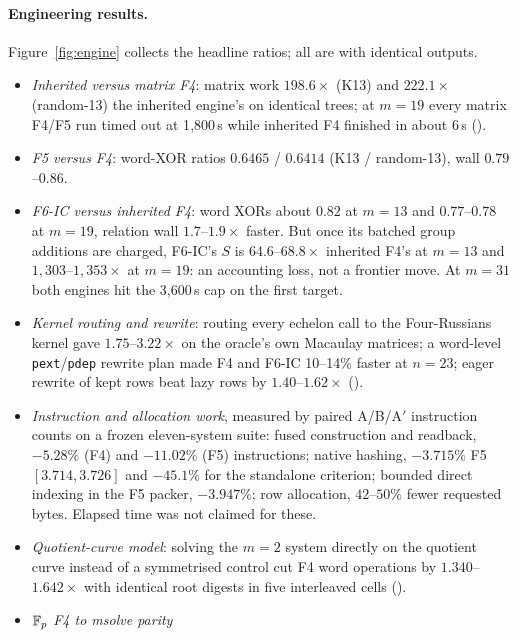 \paragraph{Engineering results.} Figure~\ref{fig:engine} collects the
headline ratios; all are  with identical outputs.
\begin{itemize}
\item \emph{Inherited versus matrix F4}: matrix work $198.6\times$ (K13)
  and $222.1\times$ (random-13) the inherited engine's on identical trees;
  at $m=19$ every matrix F4/F5 run timed out at 1{,}800\,s while
  inherited F4 finished in about 6\,s
  ().
\item \emph{F5 versus F4}: word-XOR ratios $0.6465$ / $0.6414$ (K13 /
  random-13), wall $0.79$--$0.86$.
\item \emph{F6-IC versus inherited F4}: word XORs about $0.82$ at $m=13$
  and $0.77$--$0.78$ at $m=19$, relation wall $1.7$--$1.9\times$ faster.
  But once its batched group additions are charged, F6-IC's $S$ is
  $64.6$--$68.8\times$ inherited F4's at $m=13$ and
  $1{,}303$--$1{,}353\times$ at $m=19$: an accounting loss, not a frontier
  move. At $m=31$ both engines hit the 3{,}600\,s cap on the first target.
\item \emph{Kernel routing and rewrite}: routing every echelon call to the
  Four-Russians kernel gave $1.75$--$3.22\times$ on the oracle's own
  Macaulay matrices; a word-level \texttt{pext}/\texttt{pdep} rewrite plan
  made F4 and F6-IC 10--14\% faster at $n=23$; eager rewrite of kept rows
  beat lazy rows by $1.40$--$1.62\times$
  ().
\item \emph{Instruction and allocation work}, measured by paired A/B/A$'$
  instruction counts on a frozen eleven-system suite: fused construction
  and readback, $-5.28\%$ (F4) and $-11.02\%$ (F5) instructions; native
  hashing, $-3.715\%$ F5 $[3.714,3.726]$ and $-45.1\%$ for the standalone
  criterion; bounded direct indexing in the F5 packer, $-3.947\%$; row
  allocation, $42$--$50\%$ fewer requested bytes. Elapsed time was not
  claimed for these.
\item \emph{Quotient-curve model}: solving the $m=2$ system directly on
  the quotient curve instead of a symmetrised control cut F4 word
  operations by $1.340$--$1.642\times$ with identical root digests in five
  interleaved cells ().
\item \emph{$\mathbb{F}_p$ F4 to msolve parity}

\end{itemize}
